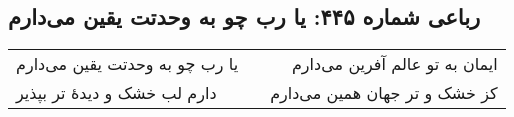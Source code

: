 \begin{center}
\section*{رباعی شماره ۴۴۵: یا رب چو به وحدتت یقین می‌دارم}
\label{sec:sh445}
\begin{longtable}{l p{0.5cm} r}
یا رب چو به وحدتت یقین می‌دارم
&&
ایمان به تو عالم آفرین می‌دارم
\\
دارم لب خشک و دیدهٔ تر بپذیر
&&
کز خشک و تر جهان همین می‌دارم
\\
\end{longtable}
\end{center}
